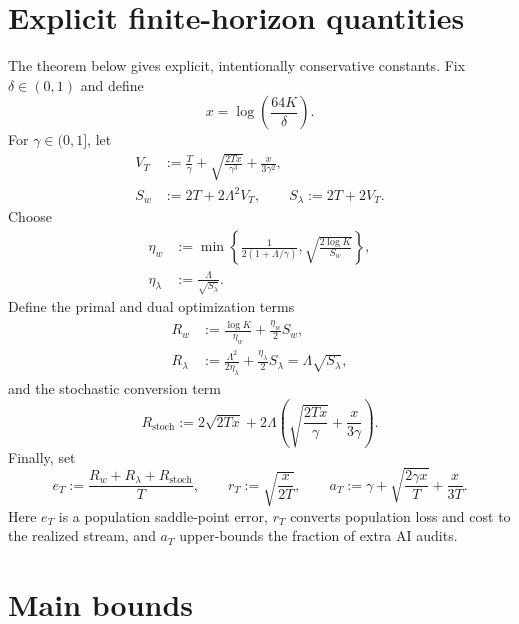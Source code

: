 \documentclass[11pt]{article}
\begin{document}
\section{Explicit finite-horizon quantities}

The theorem below gives explicit, intentionally conservative constants.  Fix
$\delta\in(0,1)$ and define
\begin{equation}
  x=\log\!\left(\frac{64K}{\delta}\right).
  \label{eq:x-def}
\end{equation}
For $\gamma\in(0,1]$, let
\begin{align}
  V_T
  &:=
  \frac{T}{\gamma}
  +\sqrt{\frac{2Tx}{\gamma^3}}
  +\frac{x}{3\gamma^2},
  \label{eq:VT}\\
  S_w
  &:=2T+2\Lambda^2V_T,
  \qquad
  S_\lambda:=2T+2V_T.
  \label{eq:S-def}
\end{align}
Choose
\begin{align}
  \eta_w
  &:=%
  \min\left\{
    \frac{1}{2(1+\Lambda/\gamma)},
    \sqrt{\frac{2\log K}{S_w}}
  \right\},
  \label{eq:eta-w}\\
  \eta_\lambda
  &:=%
  \frac{\Lambda}{\sqrt{S_\lambda}}.
  \label{eq:eta-lambda}
\end{align}
Define the primal and dual optimization terms
\begin{align}
  R_w
  &:=%
  \frac{\log K}{\eta_w}+\frac{\eta_w}{2}S_w,
  \label{eq:Rw}\\
  R_\lambda
  &:=%
  \frac{\Lambda^2}{2\eta_\lambda}
  +\frac{\eta_\lambda}{2}S_\lambda
  =\Lambda\sqrt{S_\lambda},
  \label{eq:Rlambda}
\end{align}
and the stochastic conversion term
\begin{equation}
  R_{\mathrm{stoch}}
  :=
  2\sqrt{2Tx}
  +2\Lambda\left(
    \sqrt{\frac{2Tx}{\gamma}}+\frac{x}{3\gamma}
  \right).
  \label{eq:Rstoch}
\end{equation}
Finally, set
\begin{equation}
  e_T
  :=
  \frac{R_w+R_\lambda+R_{\mathrm{stoch}}}{T},
  \qquad
  r_T:=\sqrt{\frac{x}{2T}},
  \qquad
  a_T:=\gamma+\sqrt{\frac{2\gamma x}{T}}+\frac{x}{3T}.
  \label{eq:error-terms}
\end{equation}
Here $e_T$ is a population saddle-point error, $r_T$ converts population loss
and cost to the realized stream, and $a_T$ upper-bounds the fraction of extra
AI audits.

\section{Main bounds}
\end{document}
